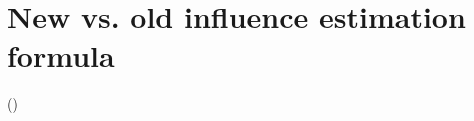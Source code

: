 
\section{New vs. old influence estimation formula}
\label{si-sec:new-vs-old-formula}

 ({\citep{Rizoiu2018a}})